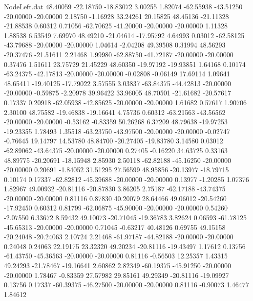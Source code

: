 \begin{filecontents}{NodeLeft.dat}
  48.40059  -22.18750  -18.83072     3.00255    1.82074  -62.55938  -43.51250  -20.00000  -20.00000    2.18750   -1.16928   33.24261   20.15825
  48.45136  -21.11328  -21.88538     0.60312    0.71056  -62.70625  -41.20000  -20.00000  -20.00000    1.11328    1.88538    6.53549    7.69970
  48.49210  -21.04614  -17.95792     4.64993    0.03012  -62.58125  -43.79688  -20.00000  -20.00000    1.04614   -2.04208   49.39508    0.31994
  48.56293  -20.37476  -21.51611     2.21468    1.99980  -62.88750  -41.72187  -20.00000  -20.00000    0.37476    1.51611   23.75729   21.45229
  48.60350  -19.97192  -19.93851     1.64168    0.10174  -63.24375  -42.17813  -20.00000  -20.00000   -0.02808   -0.06149   17.69114    1.09641
  48.65411  -19.40125  -17.79022     3.57555    3.03837  -63.84375  -44.42813  -20.00000  -20.00000   -0.59875   -2.20978   39.96422   33.96005
  48.70501  -21.61682  -20.57617     0.17337    0.20918  -62.05938  -42.85625  -20.00000  -20.00000    1.61682    0.57617    1.90706    2.30100
  48.75582  -19.46838  -19.16641     4.75736    0.60312  -63.21563  -43.56562  -20.00000  -20.00000   -0.53162   -0.83359   50.26268    6.37209
  48.79638  -19.97253  -19.23355     1.78493    1.35518  -63.23750  -43.97500  -20.00000  -20.00000   -0.02747   -0.76645   19.14797   14.53780
  48.84700  -20.27405  -19.83780     3.14580    0.03012  -62.89062  -43.64375  -20.00000  -20.00000    0.27405   -0.16220   34.63725    0.33163
  48.89775  -20.20691  -18.15948     2.85930    2.50118  -62.82188  -45.16250  -20.00000  -20.00000    0.20691   -1.84052   31.51295   27.56599
  48.95856  -20.13977  -18.79715     0.10174    0.17337  -62.82812  -45.39688  -20.00000  -20.00000    0.13977   -1.20285    1.07376    1.82967
  49.00932  -20.81116  -20.87830     3.86205    2.75187  -62.17188  -43.74375  -20.00000  -20.00000    0.81116    0.87830   40.20079   28.64466
  49.06012  -20.54260  -17.92450     0.60312    0.81799  -62.06875  -45.90000  -20.00000  -20.00000    0.54260   -2.07550    6.33672    8.59432
  49.10073  -20.71045  -19.36783     3.82624    0.06593  -61.78125  -45.65313  -20.00000  -20.00000    0.71045   -0.63217   40.48126    0.69755
  49.15158  -20.24048  -20.24063     2.10724    2.21468  -61.97187  -44.82188  -20.00000  -20.00000    0.24048    0.24063   22.19175   23.32320
  49.20234  -20.81116  -19.43497     1.17612    0.13756  -61.43750  -45.36563  -20.00000  -20.00000    0.81116   -0.56503   12.25357    1.43315
  49.24293  -21.78467  -19.16641     2.60862    2.82349  -60.19375  -45.91250  -20.00000  -20.00000    1.78467   -0.83359   27.57982   29.85161
  49.29349  -20.81116  -19.09927     0.13756    0.17337  -60.39375  -46.27500  -20.00000  -20.00000    0.81116   -0.90073    1.46477    1.84612

\end{filecontents}

